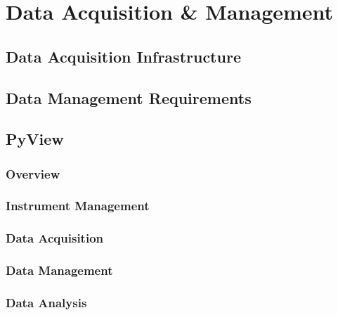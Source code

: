 \chapter{Data Acquisition \& Management}


\section{Data Acquisition Infrastructure}


\section{Data Management Requirements}


\section{PyView}


\subsection{Overview}


\subsection{Instrument Management}


\subsection{Data Acquisition}


\subsection{Data Management}


\subsection{Data Analysis}

